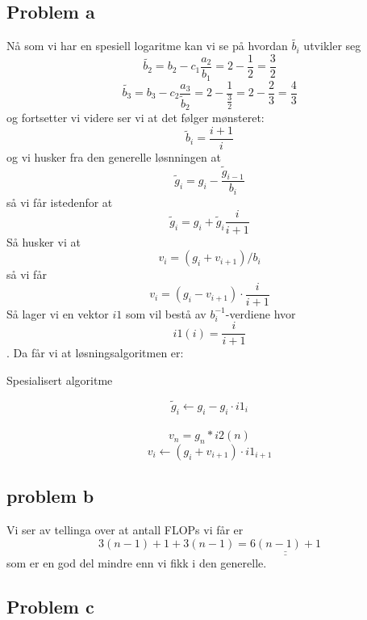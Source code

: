 \documentclass[english,notitlepage]{revtex4-1}  %
\begin{document}
\subsection*{Problem a}
Nå som vi har en spesiell logaritme kan vi se på hvordan $\tilde{b_i}$ utvikler seg
$$
\tilde{b_2}=b_2-c_1\frac{a_2}{b_1}=2-\frac{1}{2}=\frac{3}{2}
$$
$$
\tilde{b_3}=b_3-c_2\frac{a_3}{\tilde{b}_2}=2-\frac{1}{\frac{3}{2}}=2-\frac{2}{3}=\frac{4}{3}
$$
og fortsetter vi videre ser vi at det følger mønsteret:
$$
\tilde{b}_i=\frac{i+1}{i}
$$
og vi husker fra den generelle løsnningen at 
$$
\tilde{g}_i=g_i-\frac{\tilde{g}_{i-1}}{b_i}
$$
så vi får istedenfor at
$$
\tilde{g}_i=g_i+\tilde{g}_i\frac{i}{i+1}
$$
Så husker vi at 
$$
v_i=(g_i+v_{i+1})/b_i
$$
så vi får
$$
v_i=(g_i-v_{i+1})\cdot\frac{i}{i+1}
$$
Så lager vi en vektor $i1$ som vil bestå av $b_i^{-1}$-verdiene hvor $$i1(i)=\frac{i}{i+1}$$. Da får vi at løsningsalgoritmen er:
\begin{algorithm}[H]
	\caption{Spesialisert algoritme}\label{algo:spec}
	\begin{algorithmic}
	 
	\State $$\widetilde{g}_{i} \leftarrow g_{i} - g_i \cdot i1_i$$  \\
	\EndFor {}
	\State $$v_n=g_n*i2(n)$$ 
	 
	\State $$v_i \leftarrow (g_i+v_{i+1})\cdot i1_{i+1}$$  
	\EndFor {}
	\end{algorithmic}
\end{algorithm}

\subsection*{problem b}
Vi ser av tellinga over at antall FLOPs vi får er
$$
3(n-1)+1+3(n-1)=\underline{\underline{6(n-1)+1}}
$$
som er en god del mindre enn vi fikk i den generelle.

\subsection*{Problem c}
\end{document}
